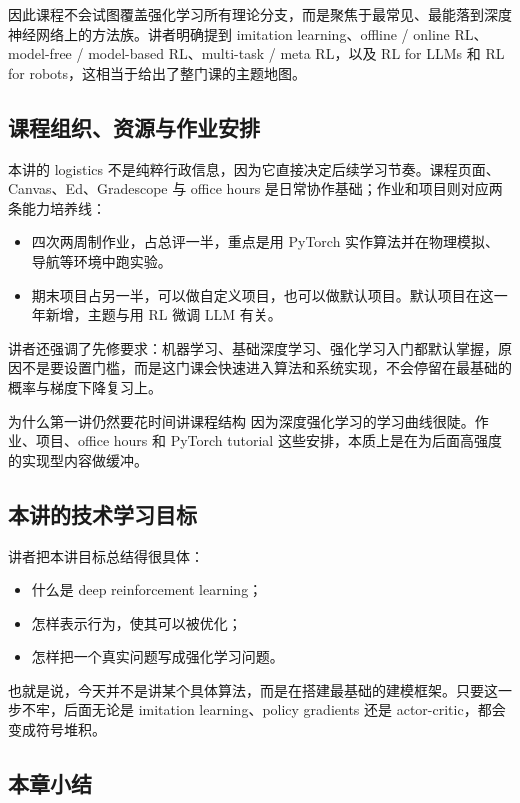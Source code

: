 \documentclass[a4paper]{article}
\begin{document}
因此课程不会试图覆盖强化学习所有理论分支，而是聚焦于最常见、最能落到深度神经网络上的方法族。讲者明确提到 imitation learning、offline / online RL、model-free / model-based RL、multi-task / meta RL，以及 RL for LLMs 和 RL for robots，这相当于给出了整门课的主题地图。

\subsection{课程组织、资源与作业安排}

本讲的 logistics 不是纯粹行政信息，因为它直接决定后续学习节奏。课程页面、Canvas、Ed、Gradescope 与 office hours 是日常协作基础；作业和项目则对应两条能力培养线：
\begin{itemize}
\item 四次两周制作业，占总评一半，重点是用 PyTorch 实作算法并在物理模拟、导航等环境中跑实验。
\item 期末项目占另一半，可以做自定义项目，也可以做默认项目。默认项目在这一年新增，主题与用 RL 微调 LLM 有关。
\end{itemize}

讲者还强调了先修要求：机器学习、基础深度学习、强化学习入门都默认掌握，原因不是要设置门槛，而是这门课会快速进入算法和系统实现，不会停留在最基础的概率与梯度下降复习上。

\begin{knowledgebox}{为什么第一讲仍然要花时间讲课程结构}
因为深度强化学习的学习曲线很陡。作业、项目、office hours 和 PyTorch tutorial 这些安排，本质上是在为后面高强度的实现型内容做缓冲。
\end{knowledgebox}

\subsection{本讲的技术学习目标}

讲者把本讲目标总结得很具体：
\begin{itemize}
\item 什么是 deep reinforcement learning；
\item 怎样表示行为，使其可以被优化；
\item 怎样把一个真实问题写成强化学习问题。
\end{itemize}

也就是说，今天并不是讲某个具体算法，而是在搭建最基础的建模框架。只要这一步不牢，后面无论是 imitation learning、policy gradients 还是 actor-critic，都会变成符号堆积。

\subsection{本章小结}
\end{document}
